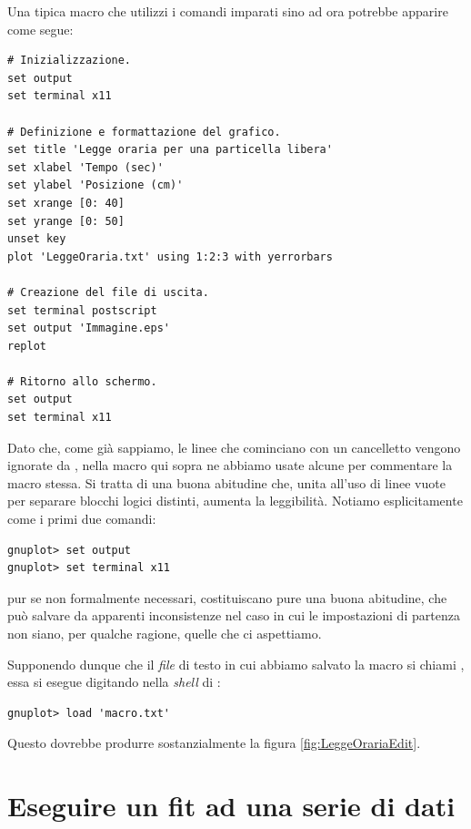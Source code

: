 Una tipica macro che utilizzi i comandi imparati sino ad ora potrebbe apparire
come segue:
\begin{verbatim}
# Inizializzazione.
set output
set terminal x11

# Definizione e formattazione del grafico.
set title 'Legge oraria per una particella libera'
set xlabel 'Tempo (sec)'
set ylabel 'Posizione (cm)'
set xrange [0: 40]
set yrange [0: 50]
unset key
plot 'LeggeOraria.txt' using 1:2:3 with yerrorbars

# Creazione del file di uscita.
set terminal postscript
set output 'Immagine.eps'
replot

# Ritorno allo schermo.
set output
set terminal x11
\end{verbatim}

Dato che, come gi\`a sappiamo, le linee che cominciano con un cancelletto
vengono ignorate da \gnuplot, nella macro qui sopra ne abbiamo usate alcune per
commentare la macro stessa. Si tratta di una buona abitudine che, unita all'uso
di linee vuote per separare blocchi logici distinti, aumenta la
leggibilit\`a.
Notiamo esplicitamente come i primi due comandi:
\begin{verbatim}
gnuplot> set output
gnuplot> set terminal x11
\end{verbatim}
pur se non formalmente necessari, costituiscano pure una buona abitudine,
che pu\`o salvare da apparenti inconsistenze nel caso in cui le impostazioni
di partenza non siano, per qualche ragione, quelle che ci aspettiamo. 

Supponendo dunque che il \emph{file} di testo in cui abbiamo salvato la macro
si chiami , essa si esegue digitando nella \emph{shell} di
\gnuplot:
\begin{verbatim}
gnuplot> load 'macro.txt'
\end{verbatim}
Questo dovrebbe produrre sostanzialmente la figura \ref{fig:LeggeOrariaEdit}.


\section{Eseguire un fit ad una serie di dati}

